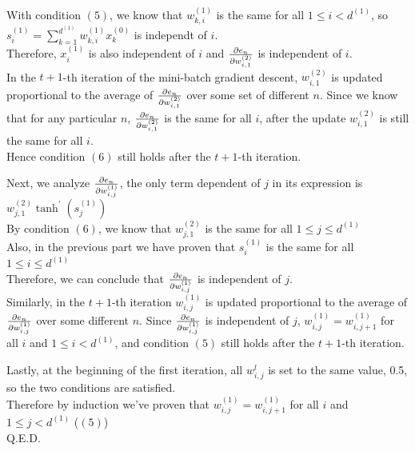\documentclass[11pt]{article}
\theoremstyle{definition}
\begin{document}
With condition $(5)$, we know that $w_{k, i}^{(1)}$ is the same for all $1\leq i < d^{(1)}$, so $s_i^{(1)} = \sum_{k = 1}^{d^{(1)}}w_{k, i}^{(1)}x_k^{(0)}$ is independt of $i$. \\ 
Therefore, $x_i^{(1)}$ is also independent of $i$ and $\pdv{e_n}{w_{i, 1}^{(2)}}$ is independent of $i$. \\ 
In the $t + 1$-th iteration of the mini-batch gradient descent, $w_{i, 1}^{(2)}$ is updated proportional to the average of $\pdv{e_n}{w_{i, 1}^{(2)}}$ over some set of different $n$. Since we know that for any particular $n$, $\pdv{e_n}{w_{i, 1}^{(2)}}$ is the same for all $i$, after the update $w_{i, 1}^{(2)}$ is still the same for all $i$. \\ 
Hence condition $(6)$ still holds after the $t + 1$-th iteration. \\ 
\par 
Next, we analyze $\pdv{e_n}{w_{i, j}^{(1)}}$, the only term dependent of $j$ in its expression is $w_{j, 1}^{(2)}\tanh^\prime(s_j^{(1)})$ \\ 
By condition $(6)$, we know that $w_{j, 1}^{(2)}$ is the same for all $1\leq j\leq d^{(1)}$ \\ 
Also, in the previous part we have proven that $s_i^{(1)}$ is the same for all $1\leq i\leq d^{(1)}$ \\ 
Therefore, we can conclude that $\pdv{e_n}{w_{i, j}^{(1)}}$ is independent of $j$. \\ 
Similarly, in the $t + 1$-th iteration $w_{i, j}^{(1)}$ is updated proportional to the average of $\pdv{e_n}{w_{i, j}^{(1)}}$ over some different $n$. Since $\pdv{e_n}{w_{i, j}^{(1)}}$ is independent of $j$, $w_{i, j}^{(1)} = w_{i, j + 1}^{(1)}$ for all $i$ and $1\leq i < d^{(1)}$, and condition $(5)$ still holds after the $t+1$-th iteration. \\ 
\par
Lastly, at the beginning of the first iteration, all $w_{i, j}^{l}$ is set to the same value, 0.5, so the two conditions are satisfied. \\ 
Therefore by induction we've proven that $w_{i, j}^{(1)} = w_{i, j + 1}^{(1)}$ for all $i$ and $1\leq j < d^{(1)}$ ($(5)$) \\ 
Q.E.D.
\newpage
\end{document}
